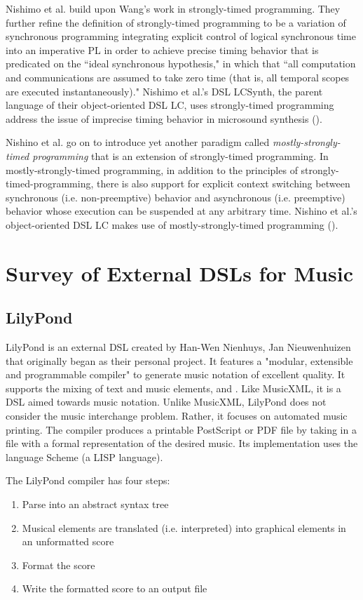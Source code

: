\documentclass{report}
\newcommand\citeparen[1]{(\cite{#1})}
\begin{document}
Nishimo et al. build upon Wang's work in strongly-timed programming. They further refine the definition of strongly-timed programming to be a variation of synchronous programming  integrating explicit control of logical synchronous time into an imperative PL in order to achieve precise timing behavior that is predicated on the ``ideal synchronous hypothesis," in which  that ``all computation and communications are assumed to take zero time (that is, all temporal scopes are executed instantaneously)." Nishimo  et al.'s DSL LCSynth, the parent language of  their object-oriented DSL LC, uses strongly-timed programming address the issue of imprecise  timing behavior in microsound synthesis \citeparen{nishino_2012}.

Nishino et al. go on to introduce yet another paradigm called  \textit{mostly-strongly-timed programming} that is an extension of strongly-timed programming. In mostly-strongly-timed programming, in addition to the principles of strongly-timed-programming, there is also support for  explicit  context  switching  between synchronous (i.e. non-preemptive) behavior and asynchronous (i.e. preemptive) behavior whose execution can be suspended at any arbitrary  time. Nishino et al.'s object-oriented DSL LC makes use of mostly-strongly-timed programming \citeparen{nishino_2012}.

\section{Survey of External DSLs for Music}
\label{sec:external}

\subsection{LilyPond}
LilyPond is an external DSL created by Han-Wen Nienhuys, Jan Nieuwenhuizen that originally began as their personal project. It features a "modular, extensible and programmable compiler" to generate music notation of excellent quality. It supports the mixing of text and music elements, and .   Like MusicXML, it is a DSL aimed towards music notation. Unlike MusicXML, LilyPond does not consider the music interchange problem. Rather, it focuses on automated music printing. The compiler produces a printable PostScript or PDF file by taking in a file with a formal representation of the desired music. Its implementation uses the language Scheme (a LISP language). 

The LilyPond compiler has four steps:
\begin{enumerate}[noitemsep]
\item Parse into an abstract syntax tree
\item Musical elements are translated (i.e. interpreted) into graphical elements in an unformatted score
\item Format the score
\item Write the formatted score to an output file
\end{enumerate}
\end{document}
